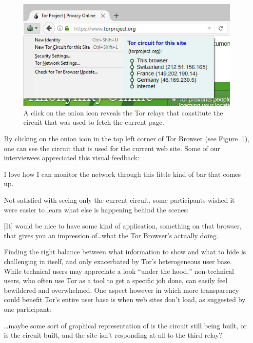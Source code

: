 \begin{figure}[t]
    \centering
    \includegraphics[width=\linewidth]{figures/tor-button-screenshot.jpg}
    \caption{A click on the onion icon reveals the Tor relays that constitute
    the circuit that was used to fetch the current page.}
    \label{fig:tor-button}
\end{figure}

By clicking on the onion icon in the top left corner of Tor Browser (see
Figure~\ref{fig:tor-button}), one can see the circuit that is used for the
current web site.  Some of our interviewees appreciated this visual feedback:

\begin{displayquote}[P08]
I love how I can monitor the network through this little kind of bar that comes
up.
\end{displayquote}

Not satisfied with seeing only the current circuit, some participants wished it
were easier to learn what else is happening behind the scenes:

\begin{displayquote}[P02]
{[It]} would be nice to have some kind of application, something on that browser,
that gives you an impression of\dots what the Tor Browser's actually doing.
\end{displayquote}

Finding the right balance between what information to show and what to hide is
challenging in itself, and only exacerbated by Tor's heterogeneous user base.
While technical users may appreciate a look ``under the hood,'' non-technical
users, who often use Tor as a tool to get a specific job done, can easily feel
bewildered and overwhelmed.  One aspect however in which more transparency could
benefit Tor's entire user base is when web sites don't load, as suggested by one
participant:

\begin{displayquote}[P05]
\dots maybe some sort of graphical representation of is the circuit still
being built, or is the circuit built, and the site isn't responding at all to
the third relay?
\end{displayquote}

